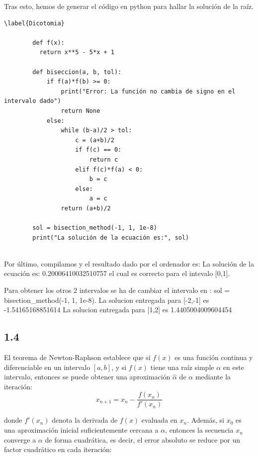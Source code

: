 \documentclass[12pt]{article}
\begin{document}
      Tras esto, hemos de generar el código en python para hallar la solución de la raíz.

      \begin{lstlisting}\label{Dicotomia}

        def f(x):
          return x**5 - 5*x + 1

        def biseccion(a, b, tol):
            if f(a)*f(b) >= 0:
                print("Error: La función no cambia de signo en el intervalo dado")
                return None
            else:
                while (b-a)/2 > tol:
                    c = (a+b)/2
                    if f(c) == 0:
                        return c
                    elif f(c)*f(a) < 0:
                        b = c
                    else:
                        a = c
                return (a+b)/2

        sol = bisection_method(-1, 1, 1e-8)
        print("La solución de la ecuación es:", sol)
      
      \end{lstlisting}

      Por último, compilamos y el resultado dado por el ordenador es:
      La solución de la ecuación es: 0.20006410032510757 el cual es correcto para el intevalo [0,1].

      Para obtener los otros 2 intervalos se ha de cambiar el intervalo en : sol = bisection_method(-1, 1, 1e-8).
      La solucion entregada para [-2,-1] es -1.54165168851614
      La solucion entregada para [1,2] es 1.4405004009604454

      \subsection{1.4}

      El teorema de Newton-Raphson establece que si $f(x)$ es una función continua y diferenciable en un intervalo $[a,b]$, y si $f(x)$ tiene una raíz simple $\alpha$ en este intervalo, entonces se puede obtener una aproximación $\hat{\alpha}$ de $\alpha$ mediante la iteración:
      \begin{equation}\label{Newton_a}
        
        x_{n+1} = x_{n}-\frac{f(x_n)}{f'(x_n)}

      \end{equation}

      donde $f'(x_n)$ denota la derivada de $f(x)$ evaluada en $x_n$. Además, si $x_0$ es una aproximación inicial suficientemente cercana a $\alpha$, entonces la secuencia ${x_n}$ converge a $\alpha$ de forma cuadrática, es decir, el error absoluto se reduce por un factor cuadrático en cada iteración:
\end{document}
